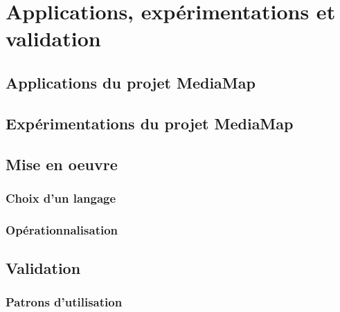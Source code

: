 \chapter{Applications, expérimentations et validation}\label{chap:app}
\minitoc
\section{Applications du projet MediaMap}\label{sec:app}
\section{Expérimentations du projet MediaMap}\label{sec:xp}

\section{Mise en oeuvre}\label{sec:meo}
\minitoc
\subsection{Choix d'un langage}\label{sec:ln}
\subsection{Opérationnalisation}\label{sec:op}

\section{Validation}\label{sec:val}
\subsection{Patrons d'utilisation}
\cite{Isaac2005}



